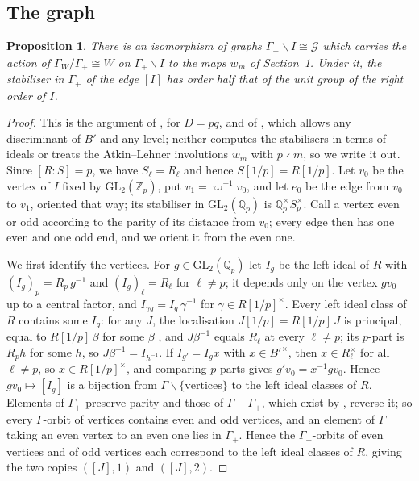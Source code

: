 \documentclass[11pt]{amsart}
\theoremstyle{plain}
\newtheorem{proposition}[theorem]{Proposition}
\theoremstyle{remark}
\newcommand{\Z}{\mathbb{Z}}
\newcommand{\Qp}{\mathbb{Q}_p}
\newcommand{\GL}{\mathrm{GL}}
\begin{document}
\subsection{The graph}

\begin{proposition}\label{prop:classes}
There is an isomorphism of graphs $\Gamma_+\backslash I \cong \mathcal{G}$ which carries the action of $\Gamma_W/\Gamma_+ \cong W$ on $\Gamma_+\backslash I$ to the maps $w_m$ of Section~1. Under it, the stabiliser in $\Gamma_+$ of the edge $[I]$ has order half that of the unit group of the right order of $I$.
\end{proposition}

\begin{proof}
This is the argument of \cite[Propositions~4.4 and~4.6]{Rib}, for $D = pq$, and of \cite[\S1, proof of Proposition~1.4]{BD98}, which allows any discriminant of $B'$ and any level; neither computes the stabilisers in terms of ideals or treats the Atkin--Lehner involutions $w_m$ with $p \nmid m$, so we write it out. Since $[R : S] = p$, we have $S_\ell = R_\ell$ and hence $S[1/p] = R[1/p]$. Let $v_0$ be the vertex of $I$ fixed by $\GL_2(\Z_p)$, put $v_1 = \varpi^{-1}v_0$, and let $e_0$ be the edge from $v_0$ to $v_1$, oriented that way; its stabiliser in $\GL_2(\Qp)$ is $\Qp^\times S_p^\times$. Call a vertex even or odd according to the parity of its distance from $v_0$; every edge then has one even and one odd end, and we orient it from the even one.

We first identify the vertices. For $g \in \GL_2(\Qp)$ let $I_g$ be the left ideal of $R$ with $(I_g)_p = R_p\,g^{-1}$ and $(I_g)_\ell = R_\ell$ for $\ell \neq p$; it depends only on the vertex $g v_0$ up to a central factor, and $I_{\gamma g} = I_g\,\gamma^{-1}$ for $\gamma \in R[1/p]^\times$. Every left ideal class of $R$ contains some $I_g$: for any $J$, the localisation $J[1/p] = R[1/p]\,J$ is principal, equal to $R[1/p]\,\beta$ for some $\beta$ \cite[Theorem~28.5.5]{Voi}, and $J\beta^{-1}$ equals $R_\ell$ at every $\ell \neq p$; its $p$-part is $R_p h$ for some $h$, so $J\beta^{-1} = I_{h^{-1}}$. If $I_{g'} = I_g x$ with $x \in B'^\times$, then $x \in R_\ell^\times$ for all $\ell \neq p$, so $x \in R[1/p]^\times$, and comparing $p$-parts gives $g'v_0 = x^{-1}g v_0$. Hence $g v_0 \mapsto [I_g]$ is a bijection from $\Gamma\backslash\{\text{vertices}\}$ to the left ideal classes of $R$. Elements of $\Gamma_+$ preserve parity and those of $\Gamma - \Gamma_+$, which exist by \cite[Corollary~28.6.4]{Voi}, reverse it; so every $\Gamma$-orbit of vertices contains even and odd vertices, and an element of $\Gamma$ taking an even vertex to an even one lies in $\Gamma_+$. Hence the $\Gamma_+$-orbits of even vertices and of odd vertices each correspond to the left ideal classes of $R$, giving the two copies $([J], 1)$ and $([J], 2)$.


\end{proof}
\end{document}
